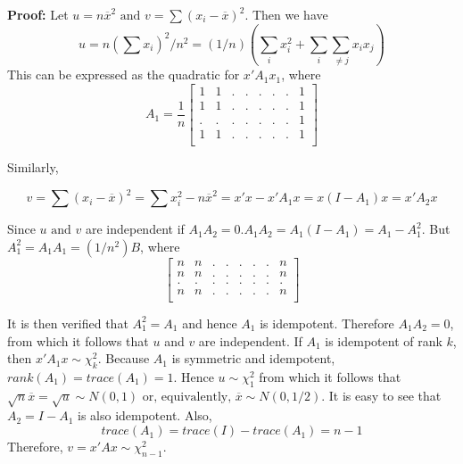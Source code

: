 \documentclass{article}
\begin{document}
\textbf{Proof:} Let \(u=n\overline{x}^2 \text{ and } v=\sum(x_i-\overline{x})^2\). Then we have
\begin{equation*}
    u=n\left(\sum x_i\right)^2/n^2=(1/n)\left(\sum_i x_i^2+\sum_i \sum_{\neq j} x_i x_j \right)
\end{equation*}
This can be expressed as the quadratic for \(x'A_1 x_1\), where
\begin{equation*}
A_1=\frac{1}{n}
    \begin{bmatrix}
        1 & 1 & . & . & . & . & . & 1\\
        1 & 1 & . & . & . & . & . & 1\\
        . & . & . & . & . & . & . & 1\\
        1 & 1 & . & . & . & . & . & 1\\
    \end{bmatrix}
\end{equation*}

Similarly,

\begin{equation*}
    v=\sum (x_i-\overline{x})^2=\sum x_i^2-n\overline{x}^2=x'x-x'A_1x=x(I-A_1)x=x'A_2x
\end{equation*}

Since \(u \text{ and } v\) are independent if \(A_1A_2=0. A_1A_2=A_1(I-A_1)=A_1-A_1^2\). But \(A_1^2=A_1A_1=(1/n^2)B\), where
\begin{equation*}
\begin{bmatrix}
    n & n & . & . & . & . & . & n\\
    n & n & . & . & . & . & . & n\\
    . & . & . & . & . & . & . & .\\
    n & n & . & . & . & . & . & n\\
\end{bmatrix}
\end{equation*}

It is then verified that \(A_1^2=A_1\) and hence \(A_1\) is idempotent. Therefore \(A_1A_2=0\), from which it follows that \(u\) and \(v\) are independent. If \(A_1\) is idempotent of rank \(k\), then \(x'A_1x\sim\chi_k^2\). Because \(A_1\) is symmetric and idempotent, \(rank(A_1)=trace(A_1)=1\). Hence \(u\sim\chi_1^2\) from which it follows that \(\sqrt{n}\overline{x}=\sqrt{u}\sim N(0,1) \text{ or, equivalently, } \overline{x}\sim N(0,1/2)\). It is easy to see that \(A_2=I-A_1\) is also idempotent. Also,
\begin{equation*}
    trace(A_1)=trace(I)-trace(A_1)=n-1
\end{equation*}
Therefore, \(v=x'Ax\sim\chi_{n-1}^2\).
\end{document}
